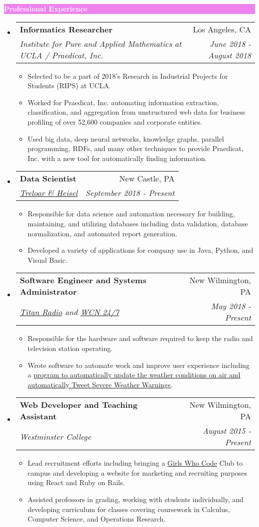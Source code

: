 \documentclass[letterpaper,11pt]{article}
\makeatletter
\newcommand{\resitem}[1]{\item #1 \vspace{-2pt}}
\newcommand{\resheading}[1]{{\large \colorbox{violet}{\begin{minipage}{\textwidth}{\textbf{#1 \vphantom{p\^{E}}}}\end{minipage}}}}
\newcommand{\ressubheading}[4]{
	\begin{tabular*}{7.0in}{l@{\extracolsep{\fill}}r}
		\textbf{#1} & #2 \\
		\textit{#3} & \textit{#4} \\
	\end{tabular*}\vspace{-6pt}}
\makeatother
\begin{document}
	\resheading{\textcolor{white}{Professional Experience}}
	\begin{itemize}[topsep=3pt, itemsep=1pt]
		\item
		\ressubheading{Informatics Researcher}{Los Angeles, CA}{Institute for Pure and Applied Mathematics at UCLA / Praedicat, Inc.}{June 2018 -August 2018}
		\begin{itemize}[topsep=3pt, itemsep=1pt]
			\resitem{Selected to be a part of 2018’s Research in Industrial Projects for Students (RIPS) at UCLA.}
			\resitem{Worked for Praedicat, Inc. automating information extraction, classification, and aggregation from unstructured web data for business profiling of over 52,600 companies and corporate entities.}
			\resitem{Used big data, deep neural networks, knowledge graphs, parallel programming, RDFs, and many other techniques to provide Praedicat, Inc. with a new tool for automatically finding information.}
		\end{itemize}
		\item
		\ressubheading{Data Scientist}{New Castle, PA}{\href{http://treloaronline.com/}{Treloar \& Heisel}}{September 2018 - Present}
		\begin{itemize}[topsep=3pt, itemsep=1pt]
			\resitem{Responsible for data science and automation necessary for building, maintaining, and utilizing databases including data validation, database normalization, and  automated report generation.}
			\resitem{Developed a variety of applications for company use in Java, Python, and Visual Basic.}
		\end{itemize}
		\item
		\ressubheading{Software Engineer and Systems Administrator}{New Wilmington, PA}{\href{http://titanradio.net/}{Titan Radio} and \href{https://www.wcn247.com/}{WCN 24/7}}{May 2018 - Present}
		\begin{itemize}[topsep=3pt, itemsep=1pt]
			\resitem{Responsible for the hardware and software required to keep the radio and television station operating.}
			\resitem{Wrote software to automate work and improve user experience including a \href{https://github.com/alexandermichels/WeatherWaves}{program to automatically update the weather conditions on air and automatically Tweet Severe Weather Warnings}.}
		\end{itemize}
		\item
		\ressubheading{Web Developer and Teaching Assistant}{New Wilmington, PA}{Westminster College}{August 2015 - Present}
		\begin{itemize}[topsep=3pt, itemsep=1pt]
			\resitem{Lead recruitment efforts including bringing a \href{https://girlswhocode.com}{Girls Who Code} Club to campus and  developing a website for marketing and recruiting purposes using React and Ruby on Rails.}
			\resitem{Assisted professors in grading, working with students individually, and developing curriculum for classes covering coursework in Calculus, Computer Science, and Operations Research.}
		\end{itemize}
	

\end{itemize}
\end{document}
